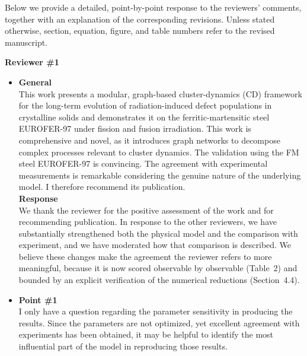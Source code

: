 \documentclass{article}
\newif\ifshowauthornotes
\newcommand{\authornote}[1]{\ifshowauthornotes{\color{red}\ [\textbf{Author action:} #1]}\fi}
\begin{document}
\authornote{The template letter states that changes are highlighted in color. Because the revision restructures the entire manuscript, consider whether to submit a highlighted version, a latexdiff, or only this summary, and adjust this paragraph accordingly.}

Below we provide a detailed, point-by-point response to the reviewers' comments, together with an explanation of the corresponding revisions. Unless stated otherwise, section, equation, figure, and table numbers refer to the revised manuscript.
\vspace{\baselineskip}

\noindent\textbf{Reviewer \#1}
\begin{itemize}
\item \textbf{General}\\
This work presents a modular, graph-based cluster-dynamics (CD) framework for the long-term evolution of radiation-induced defect populations in crystalline solids and demonstrates it on the ferritic-martensitic steel EUROFER-97 under fission and fusion irradiation. This work is comprehensive and novel, as it introduces graph networks to decompose complex processes relevant to cluster dynamics. The validation using the FM steel EUROFER-97 is convincing. The agreement with experimental measurements is remarkable considering the genuine nature of the underlying model. I therefore recommend its publication.\\

\textbf{Response}\\
We thank the reviewer for the positive assessment of the work and for recommending publication. In response to the other reviewers, we have substantially strengthened both the physical model and the comparison with experiment, and we have moderated how that comparison is described. We believe these changes make the agreement the reviewer refers to more meaningful, because it is now scored observable by observable (Table~2) and bounded by an explicit verification of the numerical reductions (Section~4.4).

\item \textbf{Point \#1}\\
I only have a question regarding the parameter sensitivity in producing the results. Since the parameters are not optimized, yet excellent agreement with experiments has been obtained, it may be helpful to identify the most influential part of the model in reproducing those results.\\


\end{itemize}
\end{document}
